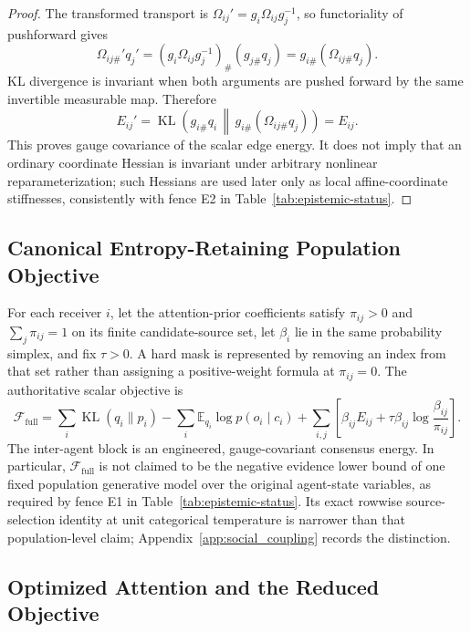 \documentclass[12pt]{article}
\newcommand{\KL}{\operatorname{KL}}
\begin{document}
\begin{proof}
The transformed transport is $\Omega_{ij}'=g_i\Omega_{ij}g_j^{-1}$, so functoriality of pushforward gives
\begin{equation}
\Omega_{ij\#}'q_j'
=(g_i\Omega_{ij}g_j^{-1})_{\#}(g_{j\#}q_j)
=g_{i\#}(\Omega_{ij\#}q_j).
\end{equation}
KL divergence is invariant when both arguments are pushed forward by the same invertible measurable map. Therefore
\begin{equation}
E_{ij}'
=\KL\!\left(g_{i\#}q_i\,\middle\|\,g_{i\#}(\Omega_{ij\#}q_j)\right)
=E_{ij}.
\end{equation}
This proves gauge covariance of the scalar edge energy. It does not imply that an ordinary coordinate Hessian is invariant under arbitrary nonlinear reparameterization; such Hessians are used later only as local affine-coordinate stiffnesses, consistently with fence E2 in Table~\ref{tab:epistemic-status}.
\end{proof}

\subsection{Canonical Entropy-Retaining Population Objective}

For each receiver $i$, let the attention-prior coefficients satisfy $\pi_{ij}>0$ and $\sum_j\pi_{ij}=1$ on its finite candidate-source set, let $\beta_i$ lie in the same probability simplex, and fix $\tau>0$. A hard mask is represented by removing an index from that set rather than assigning a positive-weight formula at $\pi_{ij}=0$. The authoritative scalar objective is
\begin{equation}
\boxed{
\mathcal F_{\mathrm{full}}
=\sum_i\KL(q_i\|p_i)
-\sum_i\mathbb E_{q_i}\log p(o_i\mid c_i)
+\sum_{i,j}\left[
\beta_{ij}E_{ij}
+\tau\beta_{ij}\log\frac{\beta_{ij}}{\pi_{ij}}
\right].}
\label{eq:canonical_full_vfe}
\end{equation}
The inter-agent block is an engineered, gauge-covariant consensus energy. In particular, $\mathcal F_{\mathrm{full}}$ is not claimed to be the negative evidence lower bound of one fixed population generative model over the original agent-state variables, as required by fence E1 in Table~\ref{tab:epistemic-status}. Its exact rowwise source-selection identity at unit categorical temperature is narrower than that population-level claim; Appendix~\ref{app:social_coupling} records the distinction.

\subsection{Optimized Attention and the Reduced Objective}
\end{document}

